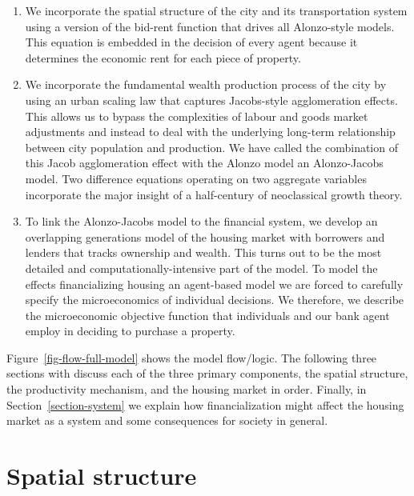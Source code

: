 \begin{enumerate}
\item We incorporate the spatial structure of the city and its transportation system using a version of the \gls{bid-rent function} that drives all Alonzo-style models. This equation is embedded in the decision of every agent because it determines the economic rent  for each piece of property.

\item We incorporate the fundamental wealth production process of the city by using an \gls{urban scaling} law that captures Jacobs-style agglomeration effects. This allows us to bypass the complexities of labour and goods market adjustments and  instead to deal with the underlying long-term relationship between city  population and production. We have called the combination of this Jacob agglomeration effect with the Alonzo model an \gls{Alonzo-Jacobs model}.  Two difference equations operating on two aggregate variables incorporate the major insight of a half-century of \gls{neoclassical growth theory}.

\item To link the Alonzo-Jacobs model to the financial system, we develop an \gls{overlapping generations} model of the housing market with borrowers and lenders that tracks ownership and wealth. This turns out to be the most detailed and computationally-intensive part of the model. To model the effects financializing housing an \gls{agent-based model} we are forced to carefully specify the microeconomics of  individual decisions. %
We therefore, we describe the microeconomic objective function that individuals and our bank agent employ in deciding to purchase a property. 
\end{enumerate}

Figure~\ref{fig-flow-full-model} shows the model flow/logic.  The following three sections with discuss each of the three primary components, the spatial structure, the productivity mechanism, and the housing market in order. Finally, in  Section~\ref{section-system} we explain how financialization might affect the housing market as a system and some consequences for society in general. %

\section{Spatial structure}

